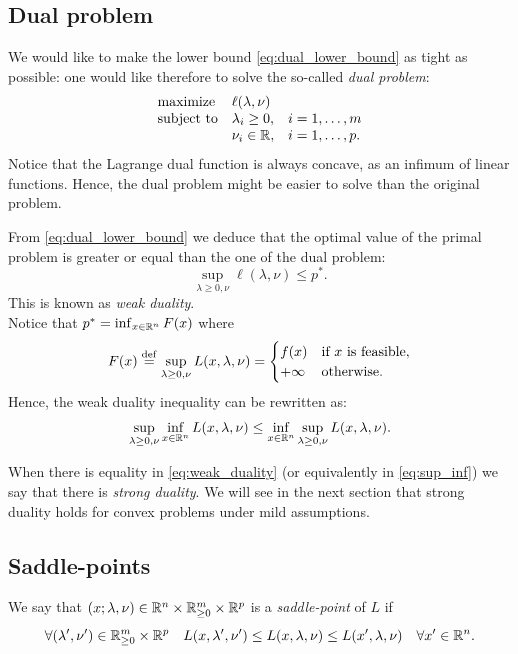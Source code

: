 \documentclass[11pt,nocut]{article}
\begin{document}
\subsection{Dual problem}

We would like to make the lower bound \eqref{eq:dual_lower_bound} as tight as possible: one would like therefore to solve the so-called \emph{dual problem}:
\begin{equation}\label{eq:dual_problem}
	\begin{array}{lll}
		\text{maximize} & \ell(\lambda,\nu) & \\
		\text{subject to} & \lambda_i \geq 0, & i=1, \dots, m \\
						  & \nu_i \in \mathbb{R}, & i=1, \dots, p.
	\end{array}
\end{equation}
Notice that the Lagrange dual function is always concave, as an infimum of linear functions. Hence, the dual problem might be easier to solve than the original problem.

From \eqref{eq:dual_lower_bound} we deduce that the optimal value of the primal problem is greater or equal than the one of the dual problem:
\begin{equation}\label{eq:weak_duality}
	\sup_{\lambda \geq 0, \nu} \ell(\lambda,\nu) \leq p^*.
\end{equation}
This is known as \emph{weak duality}.
\\

Notice that $p^* = \inf_{x \in \mathbb{R}^n} F(x)$ where
$$
F(x) \overset{\rm def}{=}
\sup_{\lambda \geq 0, \nu} L(x,\lambda,\nu)
=
\begin{cases}
	f(x) & \text{if} \ x \ \text{is feasible},\\
	+ \infty & \text{otherwise.}
\end{cases}
$$
Hence, the weak duality inequality can be rewritten as:
\begin{equation}\label{eq:sup_inf}
	\sup_{\lambda \geq 0, \nu} \inf_{x \in \mathbb{R}^n} L(x,\lambda,\nu) \leq \inf_{x \in \mathbb{R}^n} \sup_{\lambda \geq 0, \nu} L(x,\lambda,\nu).
\end{equation}

When there is equality in \eqref{eq:weak_duality} (or equivalently in \eqref{eq:sup_inf}) we say that there is \emph{strong duality}. We will see in the next section that strong duality holds for convex problems under mild assumptions.


\subsection{Saddle-points}
\begin{definition}
	We say that $(x; \lambda,\nu) \in \mathbb{R}^n \times \mathbb{R}_{\geq 0}^m \times \mathbb{R}^p$ is a \emph{saddle-point} of $L$ if
	\begin{equation}\label{eq:def_saddle}
	\forall (\lambda',\nu') \in \mathbb{R}_{\geq 0}^m \times \mathbb{R}^p \quad
	L(x,\lambda',\nu') \leq L(x,\lambda,\nu) \leq L(x',\lambda,\nu) \quad \forall x' \in \mathbb{R}^n.
\end{equation}
\end{definition}
\end{document}

